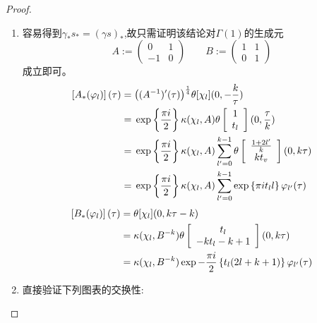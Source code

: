 \begin{proof}\
	\begin{enumerate}[(1)]
		\item 容易得到$\gamma_*s_*=(\gamma s)_*$,故只需证明该结论对$\Gamma(1)$的生成元
		$$A:=\begin{pmatrix}
		0 & 1 \\ -1 & 0
		\end{pmatrix}\qquad B:=\begin{pmatrix}
		1 & 1 \\ 0 & 1
		\end{pmatrix}$$
		成立即可。
		\begin{equation*}
		\begin{aligned}
		\left[A_*(\varphi_l) \right](\tau) =\;& \big((A^{-1})'(\tau)\big)^{\frac{1}{4}}  \theta [\chi_l](0,-\frac{k}{\tau})\\
		=\;& \exp \left\{ \frac{\pi i}{2} \right\} \kappa (\chi_l,A) \theta \left[\begin{array}{c}{1} \\ {t_l}\end{array}\right](0,\frac{\tau}{k})\\
		=\;& \exp \left\{ \frac{\pi i}{2} \right\} \kappa (\chi_l,A)\sum_{l'=0}^{k-1} \theta\left[\begin{array}{c}{\frac{1+2l'}{k}} \\ {kt_v}\end{array}\right](0,k\tau)\\
		=\;& \exp \left\{ \frac{\pi i}{2} \right\} \kappa (\chi_l,A)\sum_{l'=0}^{k-1} \exp \left\{ \pi i t_l l \right\} \varphi_{l'}(\tau)
		\end{aligned}
		\end{equation*}
		\begin{equation*}
		\begin{aligned}
		\left[B_*(\varphi_l) \right](\tau) =\;& \theta[\chi_l] (0,k\tau-k)\\
		=\;& \kappa (\chi_l,B^{-k}) \theta\left[\begin{array}{c}{t_l} \\ {-kt_l-k+1}\end{array}\right](0,k\tau)\\
		=\;& \kappa (\chi_l,B^{-k}) \exp -\frac{\pi i}{2}  \left\{ t_l(2l+k+1) \right\} \varphi_{l'}(\tau)
		\end{aligned}
		\end{equation*}
		\item 直接验证下列图表的交换性:
		\begin{center}
			
		\end{center}
	\end{enumerate}
	
	
\end{proof}
